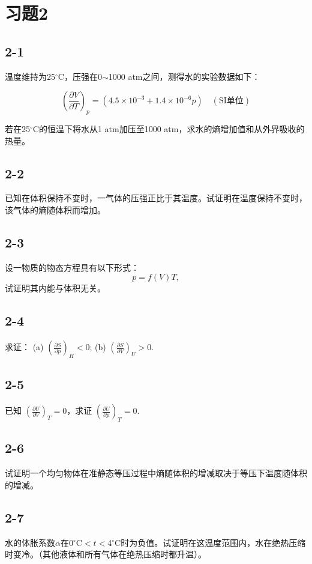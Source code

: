\section{习题2}

\newpage
\subsection{2-1}
温度维持为25$^\circ$C，压强在0$\sim$1000 atm之间，测得水的实验数据如下：

$$\left( \frac{\partial V}{\partial T} \right)_p = (4.5 \times 10^{-3} + 1.4 \times 10^{-6} p) \quad (\text{SI单位})$$

若在25$^\circ$C的恒温下将水从1 atm加压至1000 atm，求水的熵增加值和从外界吸收的热量。

\newpage
\subsection{2-2}
已知在体积保持不变时，一气体的压强正比于其温度。试证明在温度保持不变时，该气体的熵随体积而增加。

\newpage
\subsection{2-3}
设一物质的物态方程具有以下形式：
$$p = f(V)T,$$
试证明其内能与体积无关。

\newpage
\subsection{2-4}
求证：
(a) $\left( \frac{\partial S}{\partial p} \right)_H < 0$;
(b) $\left( \frac{\partial S}{\partial V} \right)_U > 0$.

\newpage
\subsection{2-5}
已知 $\left( \frac{\partial U}{\partial V} \right)_T = 0$，求证 $\left( \frac{\partial U}{\partial p} \right)_T = 0$.

\newpage
\subsection{2-6}
试证明一个均匀物体在准静态等压过程中熵随体积的增减取决于等压下温度随体积的增减。

\newpage
\subsection{2-7}
水的体胀系数$\alpha$在0$^\circ$C$<t<$4$^\circ$C时为负值。试证明在这温度范围内，水在绝热压缩时变冷。（其他液体和所有气体在绝热压缩时都升温）。

